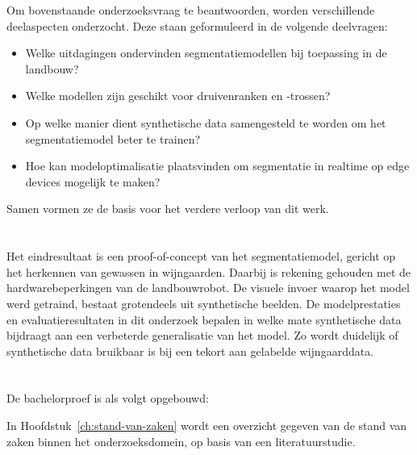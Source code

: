 Om bovenstaande onderzoeksvraag te beantwoorden, worden verschillende deelaspecten onderzocht. Deze staan geformuleerd in de volgende deelvragen:

\begin{itemize}
    \setlength{\itemsep}{0pt}
    \setlength{\parskip}{0pt}
    \item Welke uitdagingen ondervinden segmentatiemodellen bij toepassing in de landbouw?
    \item Welke modellen zijn geschikt voor druivenranken en -trossen?
    \item Op welke manier dient synthetische data samengesteld te worden om het segmentatiemodel beter te trainen?
    \item Hoe kan modeloptimalisatie plaatsvinden om segmentatie in realtime op edge devices mogelijk te maken?
\end{itemize}

Samen vormen ze de basis voor het verdere verloop van dit werk.

\section{}%
\label{sec:onderzoeksdoelstelling}

Het eindresultaat is een proof-of-concept van het segmentatiemodel, gericht op het herkennen van gewassen in wijngaarden. Daarbij is rekening gehouden met de hardwarebeperkingen van de landbouwrobot. De visuele invoer waarop het model werd getraind, bestaat grotendeels uit synthetische beelden. De modelprestaties en evaluatieresultaten in dit onderzoek bepalen in welke mate synthetische data bijdraagt aan een verbeterde generalisatie van het model. Zo wordt duidelijk of synthetische data bruikbaar is bij een tekort aan gelabelde wijngaarddata.

\section{}%
\label{sec:opzet-bachelorproef}

De bachelorproef is als volgt opgebouwd:

In Hoofdstuk~\ref{ch:stand-van-zaken} wordt een overzicht gegeven van de stand van zaken binnen het onderzoeksdomein, op basis van een literatuurstudie.

